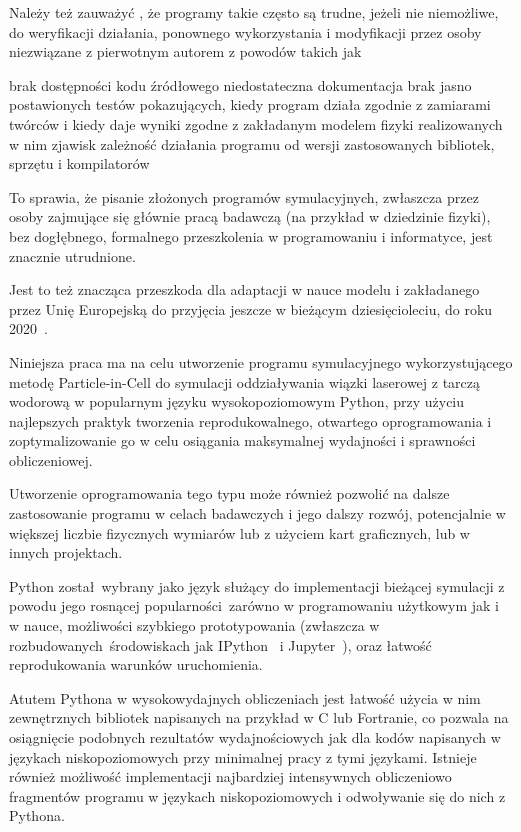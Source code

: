 Należy też zauważyć%
, że programy takie często są
trudne, jeżeli nie niemożliwe, do weryfikacji działania, ponownego wykorzystania
i modyfikacji przez osoby niezwiązane z pierwotnym autorem z powodów takich jak
\begin{itemize}
    \itemi{} brak dostępności kodu źródłowego
    \itemi{} niedostateczna dokumentacja
    \itemi{} brak jasno postawionych testów pokazujących, kiedy program działa
    zgodnie z zamiarami twórców i kiedy daje wyniki zgodne z zakładanym
    modelem fizyki realizowanych w nim zjawisk
    \itemi{} zależność działania programu od wersji zastosowanych bibliotek, sprzętu i kompilatorów
\end{itemize}

To sprawia, że pisanie złożonych programów symulacyjnych, zwłaszcza przez osoby
zajmujące się głównie pracą badawczą (na przykład w dziedzinie fizyki), bez dogłębnego, formalnego przeszkolenia
w programowaniu i informatyce, jest znacznie utrudnione.

Jest to też znacząca przeszkoda dla adaptacji
w nauce modelu  i  zakładanego przez Unię Europejską 
do przyjęcia jeszcze w bieżącym dziesięcioleciu, do roku 2020~\cite{euopenscience}.

Niniejsza praca ma na celu utworzenie programu symulacyjnego wykorzystującego metodę Particle-in-Cell
do symulacji oddziaływania wiązki laserowej z tarczą wodorową w popularnym języku
wysokopoziomowym Python, przy użyciu najlepszych praktyk tworzenia reprodukowalnego, otwartego oprogramowania
i zoptymalizowanie go w celu osiągania maksymalnej wydajności i sprawności obliczeniowej.

Utworzenie oprogramowania tego typu może również pozwolić na dalsze
zastosowanie programu w celach badawczych i jego dalszy rozwój, potencjalnie w
większej liczbie fizycznych wymiarów lub z użyciem kart graficznych, lub w
innych projektach.

Python został wybrany jako język służący do implementacji bieżącej symulacji
z powodu jego rosnącej popularności zarówno w programowaniu użytkowym jak i w nauce,
możliwości szybkiego prototypowania (zwłaszcza w rozbudowanych środowiskach jak
IPython~\cite{ipython} i Jupyter~\cite{jupyter}), oraz łatwość reprodukowania
warunków uruchomienia.

Atutem Pythona w wysokowydajnych obliczeniach jest łatwość użycia w nim
zewnętrznych bibliotek napisanych na przykład w C lub Fortranie, co pozwala na
osiągnięcie podobnych rezultatów wydajnościowych jak dla kodów napisanych w
językach niskopoziomowych przy minimalnej pracy z tymi językami. Istnieje
również możliwość implementacji najbardziej intensywnych obliczeniowo
fragmentów programu w językach niskopoziomowych i odwoływanie się do nich z
Pythona.

